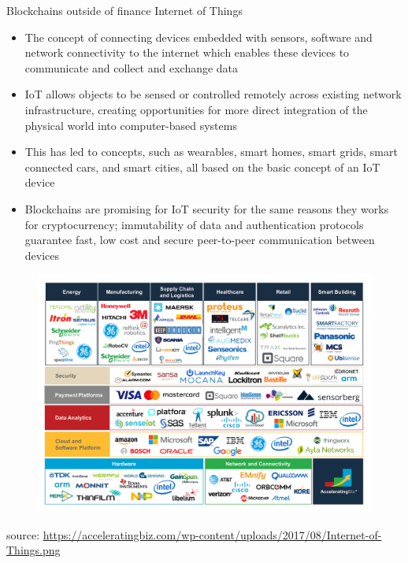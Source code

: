 \documentclass[9pt]{beamer}
\begin{document}


\begin{frame}{Blockchains outside of finance}
	Internet of Things
	\begin{itemize}
		\item The concept of connecting devices embedded with sensors, software and network connectivity to the internet which enables these devices to communicate and collect and exchange data
		\item  IoT allows objects to be sensed or controlled remotely across existing network infrastructure, creating opportunities for more direct integration of the physical world into computer-based systems
		\item This has led to concepts, such as wearables, smart homes, smart grids, smart connected cars, and smart cities, all based on the basic concept of an IoT device
		\item Blockchains are promising for IoT security for the same reasons they works for cryptocurrency; immutability of data and authentication protocols guarantee fast, low cost and secure peer-to-peer communication between devices
	\end{itemize}
\end{frame}


\begin{frame}
	\begin{figure}[]
		\centering
		\includegraphics  [scale=0.2]{Images/iot-ecosystem1}
	\end{figure}
	\begin{scriptsize}
		source: \href{https://acceleratingbiz.com/proof-point/internet-things-iot-overview-selected-devices/}{https://acceleratingbiz.com/wp-content/uploads/2017/08/Internet-of-Things.png}
	\end{scriptsize}
\end{frame}
\end{document}
